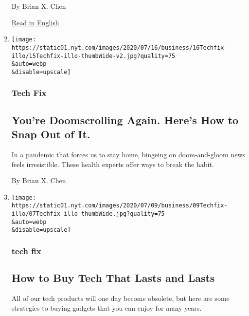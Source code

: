\begin{enumerate}
  By Brian X. Chen

  \href{https://www.nytimes.com/2020/07/15/technology/personaltech/youre-doomscrolling-again-heres-how-to-snap-out-of-it.html}{Read
  in English}
\item
  \href{/2020/07/15/technology/personaltech/youre-doomscrolling-again-heres-how-to-snap-out-of-it.html}{}

  \texttt{[image: https://static01.nyt.com/images/2020/07/16/business/16Techfix-illo/15Techfix-illo-thumbWide-v2.jpg?quality=75\\\&auto=webp\\\&disable=upscale]}

  \hypertarget{tech-fix-1}{%
  \subsubsection{Tech Fix}\label{tech-fix-1}}

  \hypertarget{youre-doomscrolling-again-heres-how-to-snap-out-of-it}{%
  \subsection{You're Doomscrolling Again. Here's How to Snap Out of
  It.}\label{youre-doomscrolling-again-heres-how-to-snap-out-of-it}}

  In a pandemic that forces us to stay home, bingeing on doom-and-gloom
  news feels irresistible. These health experts offer ways to break the
  habit.

  By Brian X. Chen
\item
  \href{/2020/07/08/technology/personaltech/tech-that-lasts.html}{}

  \texttt{[image: https://static01.nyt.com/images/2020/07/09/business/09Techfix-illo/07Techfix-illo-thumbWide.jpg?quality=75\\\&auto=webp\\\&disable=upscale]}

  \hypertarget{tech-fix-2}{%
  \subsubsection{tech fix}\label{tech-fix-2}}

  \hypertarget{how-to-buy-tech-that-lasts-and-lasts}{%
  \subsection{How to Buy Tech That Lasts and
  Lasts}\label{how-to-buy-tech-that-lasts-and-lasts}}

  All of our tech products will one day become obsolete, but here are
  some strategies to buying gadgets that you can enjoy for many years.


\end{enumerate}
